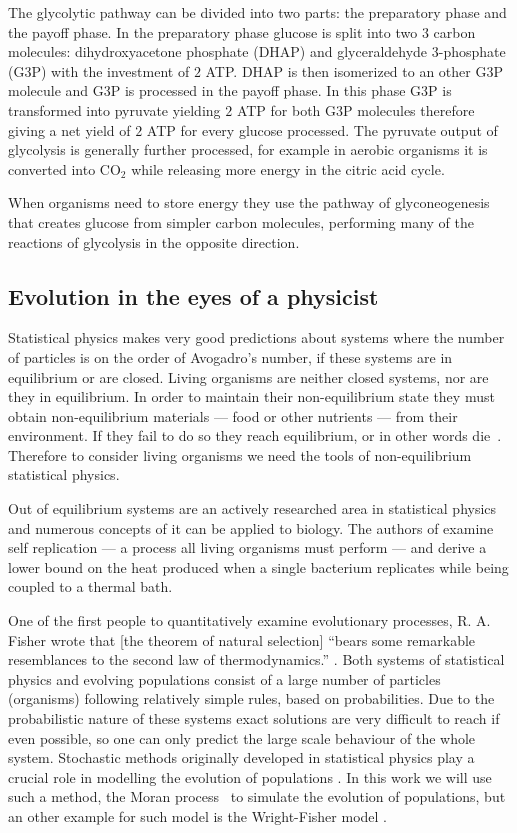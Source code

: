 \documentclass[a4paper,12pt]{article}
\begin{document}
The glycolytic pathway can be divided into two parts: the preparatory phase and the payoff phase. In the preparatory phase glucose is split into two $3$ carbon molecules: dihydroxyacetone phosphate (DHAP) and glyceraldehyde 3-phosphate (G3P) with the investment of $2$ ATP. DHAP is then isomerized to an other G3P molecule and G3P is processed in the payoff phase. In this phase G3P is transformed into pyruvate yielding $2$ ATP for both G3P molecules therefore giving a net yield of $2$ ATP for every glucose processed. The pyruvate output of glycolysis is generally further processed, for example in aerobic organisms it is converted into CO$_2$ while releasing more energy in the citric acid cycle. 

When organisms need to store energy they use the pathway of glyconeogenesis that creates glucose from simpler carbon molecules, performing many of the reactions of glycolysis in the opposite direction. %
	\subsection{Evolution in the eyes of a physicist}\label{chap:whereisphysics}

	Statistical physics makes very good predictions about systems where the number of particles is on the order of Avogadro's number, if these systems are in equilibrium or are closed. Living organisms are neither closed systems, nor are they in equilibrium. In order to maintain their non-equilibrium state they must obtain non-equilibrium materials --- food or other nutrients --- from their environment. If they fail to do so they reach equilibrium, or in other words die~\cite{irreversibility}. Therefore to consider living organisms we need the tools of non-equilibrium statistical physics. 

	Out of equilibrium systems are an actively researched area in statistical physics and numerous concepts of it can be applied to biology. The authors of \cite{selfreplication} examine self replication --- a process all living organisms must perform --- and derive a lower bound on the heat produced when a single bacterium replicates while being coupled to a thermal bath. 
	
	One of the first people to quantitatively examine evolutionary processes, R. A. Fisher wrote that [the theorem of natural selection] ``bears some remarkable resemblances to the second law of thermodynamics.'' \cite{fisherevolution}. Both systems of statistical physics and evolving populations consist of a large number of particles (organisms) following relatively simple rules, based on probabilities. Due to the probabilistic nature of these systems exact solutions are very difficult to reach if even possible, so one can only predict the large scale behaviour of the whole system. Stochastic methods originally developed in statistical physics play a crucial role in modelling the evolution of populations \cite{stochasticblythe}. In this work we will use such a method, the Moran process \cite{moranprocess}~to simulate the evolution of populations, but an other example for such model is the Wright-Fisher model \cite{mathematicalpopgen}.
\end{document}
